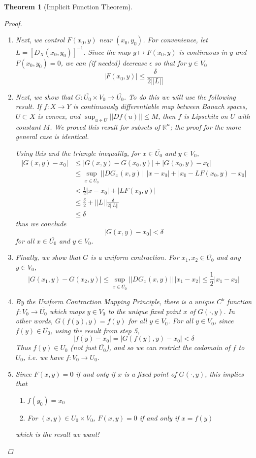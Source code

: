 \documentclass[10pt]{article}         %
\newtheorem{theorem}{Theorem}[section]
\theoremstyle{remark}
\newcommand{\R}{\mathbb{R}}
\begin{document}
\begin{theorem}[Implicit Function Theorem]
\begin{proof}
\begin{enumerate}
\item Next, we control $F(x_0, y)$ near $(x_0, y_0)$. For convenience, let $L = [D_X(x_0, y_0)]^{-1}$. Since  the map $y \mapsto F(x_0, y)$ is continuous in $y$ and $F(x_0, y_0) = 0$, we can (if needed) decrease $\epsilon$ so that for $y \in V_0$
\[
|F(x_0, y)| \leq \frac{\delta}{2 ||L||}
\]

\item Next, we show that $G: \overline{U_0} \times V_0 \rightarrow \overline{U_0}$. To do this we will use the following result. If $f: X \rightarrow Y$ is continuously differentiable map between Banach spaces, $U \subset X$ is convex, and $\sup_{u \in U} ||Df(u)|| \leq M$, then $f$ is Lipschitz on $U$ with constant $M$. We proved this result for subsets of $\R^n$; the proof for the more general case is identical.

Using this and the triangle inequality, for $x \in \overline{U_0}$ and $y \in V_0$,
\begin{align*}
|G(x, y) - x_0| &\leq |G(x, y) - G(x_0, y)| + |G(x_0, y) - x_0| \\
&\leq \sup_{x\in \overline{U_0}}||DG_x(x, y)||\:|x - x_0| + |x_0 - L F(x_0, y) - x_0 | \\
&< \frac{1}{2} |x - x_0| + |L F(x_0, y)| \\
&\leq \frac{\delta}{2} + ||L|| \frac{\delta}{2 ||L||} \\
&\leq \delta
\end{align*} 
thus we conclude
\[
|G(x, y) - x_0| < \delta
\]
for all $x \in \overline{U_0}$ and $y \in V_0$.

\item Finally, we show that $G$ is a uniform contraction. For $x_1, x_2 \in \overline{U_0}$ and any $y \in V_0$,
\[
|G(x_1, y) - G(x_2, y)| \leq \sup_{x\in \overline{U_0}}||DG_x(x, y)||\:|x_1 - x_2| \leq \frac{1}{2}|x_1 - x_2|
\]

\item By the Uniform Contraction Mapping Principle, there is a unique $C^k$ function $f: V_0 \rightarrow \overline{U_0}$ which maps $y \in V_0$ to the unique fixed point $x$ of $G(\cdot, y)$. In other words, $G(f(y),y) = f(y)$ for all $y \in V_0$. For all $y \in V_0$, since $f(y) \in \overline{U_0}$, using the result from step 5,
\[
|f(y) - x_0| = |G(f(y), y) - x_0| < \delta
\]
Thus $f(y) \in U_0$ (not just $\overline{U_0}$), and so we can restrict the codomain of $f$ to $U_0$, i.e. we have $f: V_0 \rightarrow U_0$.

\item Since $F(x, y) = 0$ if and only if $x$ is a fixed point of $G(\cdot, y)$, this implies that 
	\begin{enumerate}
	\item $f(y_0) = x_0$
	\item For $(x, y) \in U_0 \times V_0$, $F(x, y) = 0$ if and only if $x = f(y)$
	\end{enumerate}
which is the result we want!


\end{enumerate}
\end{proof}
\end{theorem}
\end{document}
